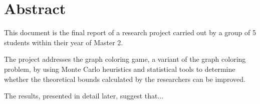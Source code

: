 \section*{Abstract}
This document is the final report of a research project carried out by a group of 5 students within their year of Master 2.

The project addresses the graph coloring game, a variant of the graph coloring problem, by using Monte Carlo heuristics and statistical tools to determine whether the theoretical bounds calculated by the researchers can be improved.

The results, presented in detail later, suggest that...
